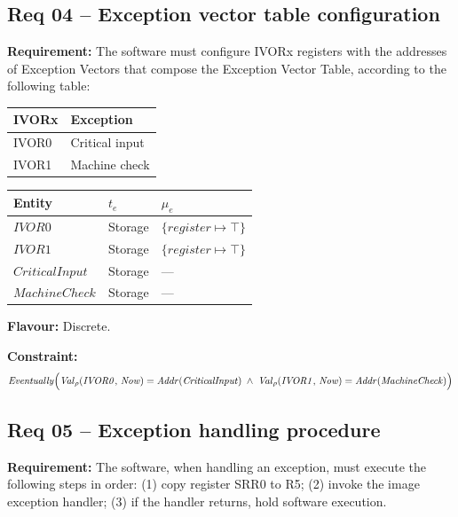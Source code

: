 \subsection{Req 04 -- Exception vector table configuration}

\textbf{Requirement:} The software must configure IVORx registers with the addresses of Exception Vectors that compose the Exception Vector Table, according to the following table:
\begin{center}
\begin{tabular}{ll}
    \toprule
    \textbf{IVORx} & \textbf{Exception} \\
    \midrule
    IVOR0 & Critical input \\
    IVOR1 & Machine check \\
    \bottomrule
\end{tabular}
\end{center}

\medskip

\begin{center}
\begin{tabular}{lll}
    \toprule
    \textbf{Entity} & $t_e$ & $\mu_e$ \\
    \midrule
    $\mathit{IVOR0}$ & Storage & $\{\mathit{register} \mapsto \top\}$ \\
    $\mathit{IVOR1}$ & Storage & $\{\mathit{register} \mapsto \top\}$ \\
    $\mathit{CriticalInput}$ & Storage & --- \\
    $\mathit{MachineCheck}$ & Storage & --- \\
    \bottomrule
\end{tabular}
\end{center}

\textbf{Flavour:} Discrete.

\textbf{Constraint:}
\[
    \mathit{Eventually}\Bigl(
        \mathit{Val}_\rho(\mathit{IVOR0},\, \mathit{Now}) = \mathit{Addr}(\mathit{CriticalInput})
        \;\land\;
        \mathit{Val}_\rho(\mathit{IVOR1},\, \mathit{Now}) = \mathit{Addr}(\mathit{MachineCheck})
    \Bigr)
\]

\subsection{Req 05 -- Exception handling procedure}

\textbf{Requirement:} The software, when handling an exception, must execute the following steps in order:
(1) copy register SRR0 to R5;
(2) invoke the image exception handler;
(3) if the handler returns, hold software execution.


